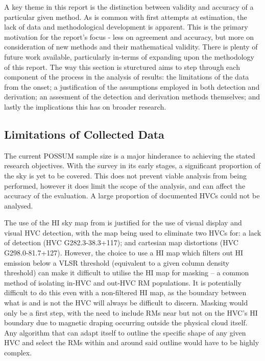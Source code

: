 A key theme in this report is the distinction between validity and accuracy of a particular given method. As is common with first attempts at estimation, the lack of data and methodological development is apparent. This is the primary motivation for the report's focus - less on agreement and accuracy, but more on consideration of new methods and their mathematical validity. There is plenty of future work available, particularly in-terms of expanding upon the methodology of this report. The way this section is sturctured aims to step through each component of the process in the analysis of results: the limitations of the data from the onset; a justification of the assumptions employed in both detection and derivation; an assesment of the detection and derivation methods themselves; and lastly the implications this has on broader research.

\subsection{Limitations of Collected Data}
\label{ssec:B1}

The current POSSUM sample size is a major hinderance to achieving the stated research objectives. With the survey in its early stages, a significant proportion of the sky is yet to be covered. This does not prevent viable analysis from being performed, however it does limit the scope of the analysis, and can affect the accuracy of the evaluation. A large proportion of documented HVCs could not be analysed.


The use of the HI sky map from \cite{ID6} is justified for the use of visual display and visual HVC detection, with the map being used to eliminate two HVCs for: a lack of detection (HVC G282.3-38.3+117); and cartesian map distortions (HVC G298.0-81.7+127). However, the choice to use a HI map which filters out HI emission below a VLSR threshold (equivalent to a given column density threshold) can make it difficult to utilise the HI map for masking – a common method of isolating in-HVC and out-HVC RM populations. It is potentially difficult to do this even with a non-filtered HI map, as the boundary between what is and is not the HVC will always be difficult to discern. Masking would only be a first step, with the need to include RMs near but not on the HVC's HI boundary due to magnetic draping occurring outside the physical cloud itself. Any algorithm that can adapt itself to outline the specific shape of any given HVC and select the RMs within and around said outline would have to be highly complex.


